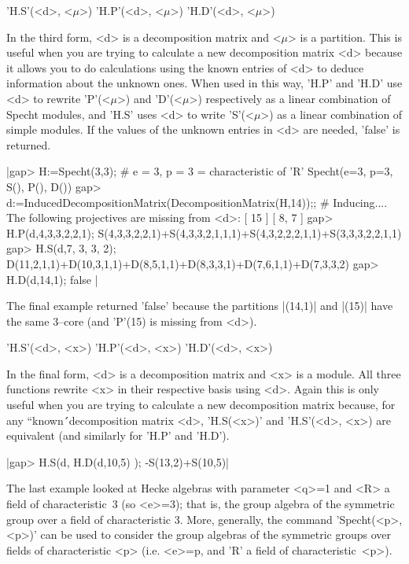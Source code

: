 \bigskip

'H.S'(<d>, <$\mu$>) \qquad 'H.P'(<d>, <$\mu$>) \qquad 'H.D'(<d>, <$\mu$>)

In the third form, <d> is a decomposition matrix and <$\mu$> is a 
partition. This is useful when you are trying to calculate a new 
decomposition matrix <d> because it allows you to do calculations using 
the known entries of <d> to deduce information about the unknown ones. 
When used in this way, 'H.P' and 'H.D' use <d> to rewrite 'P'(<$\mu$>) and
'D'(<$\mu$>) respectively as a linear combination of Specht modules, and 
'H.S' uses <d> to write 'S'(<$\mu$>) as a linear combination of simple 
modules. If the values of the unknown entries in <d> are needed, 'false' 
is returned.

|gap> H:=Specht(3,3);   # e = 3, p = 3 = characteristic of 'R'
Specht(e=3, p=3, S(), P(), D())
gap>  d:=InducedDecompositionMatrix(DecompositionMatrix(H,14));;
# Inducing....
The following projectives are missing from <d>:
    [ 15 ]  [ 8, 7 ]
gap> H.P(d,4,3,3,2,2,1);
S(4,3,3,2,2,1)+S(4,3,3,2,1,1,1)+S(4,3,2,2,2,1,1)+S(3,3,3,2,2,1,1)
gap> H.S(d,7, 3, 3, 2);
D(11,2,1,1)+D(10,3,1,1)+D(8,5,1,1)+D(8,3,3,1)+D(7,6,1,1)+D(7,3,3,2)
gap> H.D(d,14,1);
false |

The final example returned 'false' because the partitions |(14,1)|
and |(15)| have the same $3$--core (and 'P'(15) is missing from <d>).

\bigskip

'H.S'(<d>, <x>)  \qquad  'H.P'(<d>, <x>)  \qquad  'H.D'(<d>, <x>)

In the final form, <d> is a decomposition matrix and <x> is a module. All 
three functions rewrite <x> in their respective basis using <d>. Again
this is only useful when you are trying to calculate a new decomposition 
matrix because, for any ``known\'\'\ decomposition matrix <d>, 'H.S(<x>)' 
and 'H.S'(<d>, <x>) are equivalent (and similarly for 'H.P' and 'H.D').

|gap> H.S(d, H.D(d,10,5) );
-S(13,2)+S(10,5)|

 
The last example looked at Hecke algebras with parameter <q>=1 and <R> a 
field of characteristic~3 (so <e>=3); that is, the group algebra of the 
symmetric group over a field of characteristic 3. More, generally, the 
command 'Specht(<p>, <p>)' can be used to consider the group algebras of 
the symmetric groups over fields of characteristic <p> (i.e. <e>=p, and
'R' a field of characteristic~<p>). 

